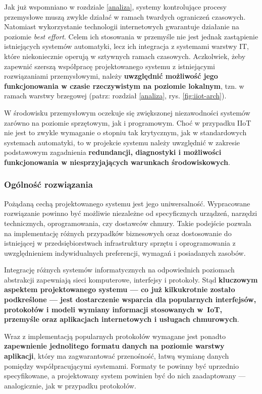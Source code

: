 \documentclass[a4paper, 12pt, twoside]{article}
\begin{document}
Jak już wspomniano w rozdziale \ref{analiza}, systemy kontrolujące
procesy przemysłowe muszą zwykle działać w ramach twardych ograniczeń czasowych.
Natomiast wykorzystanie technologii internetowych gwarantuje działanie na poziomie
\emph{best effort}. Celem ich stosowania w przemyśle nie jest jednak zastąpienie
istniejących systemów automatyki, lecz ich integracja z systemami warstwy IT,
które niekoniecznie operują w sztywnych ramach czasowych.
Aczkolwiek, żeby zapewnić szerszą współpracę projektowanego systemu
z istniejącymi rozwiązaniami przemysłowymi, należy \textbf{uwzględnić możliwość jego funkcjonowania
      w czasie rzeczywistym na poziomie lokalnym}, tzn. w ramach warstwy brzegowej
(patrz: rozdział \ref{analiza}, rys. \ref{fig:iiot-arch}).

W środowisku przemysłowym oczekuje się zwiększonej niezawodności systemów
zarówno na poziomie sprzętowym, jak i programowym. Choć w przypadku IIoT nie jest
to zwykle wymaganie o stopniu tak krytycznym, jak w standardowych systemach automatyki,
to w projekcie systemu należy uwzględnić w zakresie podstawowym
zagadnienia \textbf{redundancji, diagnostyki i możliwości funkcjonowania w niesprzyjających
      warunkach środowiskowych}.

\subsubsection{Ogólność rozwiązania}

Pożądaną cechą projektowanego systemu jest jego uniwersalność. Wypracowane rozwiązanie
powinno być możliwie niezależne od specyficznych urządzeń, narzędzi technicznych,
oprogramowania, czy dostawców chmury. Takie podejście pozwala na implementację różnych przypadków biznesowych
oraz dostosowanie do istniejącej w przedsiębiorstwach infrastruktury sprzętu i oprogramowania
z uwzględnieniem indywidualnych preferencji, wymagań i posiadanych zasobów.

Integrację różnych systemów informatycznych na odpowiednich poziomach abstrakcji
zapewniają sieci komputerowe, interfejsy i protokoły.
Stąd \textbf{kluczowym aspektem projektowanego systemu --- co już kilkukrotnie zostało podkreślone ---
      jest dostarczenie wsparcia dla popularnych
      interfejsów, protokołów i modeli wymiany informacji stosowanych w~IoT, przemyśle oraz
      aplikacjach internetowych i usługach chmurowych}.

Wraz z implementacją popularnych protokołów wymagane jest ponadto \textbf{zapewnienie
      jednolitego formatu danych na poziomie warstwy aplikacji}, który ma zagwarantować przenośność,
łatwą wymianę danych pomiędzy współpracującymi systemami. Formaty
te powinny być uprzednio specyfikowane, a projektowany system powinien być do
nich zaadaptowany --- analogicznie, jak w przypadku protokołów.
\end{document}
